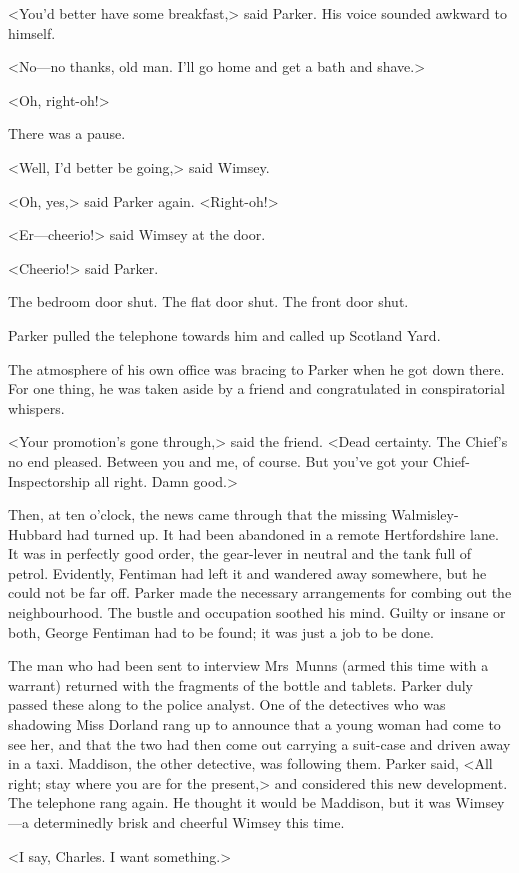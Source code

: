 <You'd better have some breakfast,> said Parker. His voice sounded awkward to himself.

<No—no thanks, old man. I'll go home and get a bath and shave.>

<Oh, right-oh!>

There was a pause.

<Well, I'd better be going,> said Wimsey.

<Oh, yes,> said Parker again. <Right-oh!>

<Er—cheerio!> said Wimsey at the door.

<Cheerio!> said Parker.

The bedroom door shut. The flat door shut. The front door shut.

Parker pulled the telephone towards him and called up Scotland Yard.

The atmosphere of his own office was bracing to Parker when he got down there. For one thing, he was taken aside by a friend and congratulated in conspiratorial whispers.

<Your promotion's gone through,> said the friend. <Dead certainty. The Chief's no end pleased. Between you and me, of course. But you've got your Chief-Inspectorship all right. Damn good.>

Then, at ten o'clock, the news came through that the missing Walmisley-Hubbard had turned up. It had been abandoned in a remote Hertfordshire lane. It was in perfectly good order, the gear-lever in neutral and the tank full of petrol. Evidently, Fentiman had left it and wandered away somewhere, but he could not be far off. Parker made the necessary arrangements for combing out the neighbourhood. The bustle and occupation soothed his mind. Guilty or insane or both, George Fentiman had to be found; it was just a job to be done.

The man who had been sent to interview Mrs~Munns (armed this time with a warrant) returned with the fragments of the bottle and tablets. Parker duly passed these along to the police analyst. One of the detectives who was shadowing Miss Dorland rang up to announce that a young woman had come to see her, and that the two had then come out carrying a suit-case and driven away in a taxi. Maddison, the other detective, was following them. Parker said, <All right; stay where you are for the present,> and considered this new development. The telephone rang again. He thought it would be Maddison, but it was Wimsey—a determinedly brisk and cheerful Wimsey this time.

<I say, Charles. I want something.>

